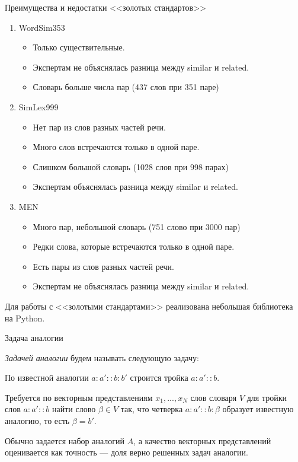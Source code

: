 \documentclass[9pt]{beamer}
\begin{document}
\begin{frame}{Преимущества и недостатки <<золотых стандартов>>}

\begin{enumerate}
    \item WordSim353
    \begin{itemize}
        \item Только существительные.
        \item Экспертам не объяснялась разница между similar и related.
        \item Словарь больше числа пар (437 слов при 351 паре)
    \end{itemize}
    \item SimLex999
    \begin{itemize}
        \item Нет пар из слов разных частей речи.
        \item Много слов встречаются только в одной паре.
        \item Слишком большой словарь (1028 слов при 998 парах)
        \item Экспертам объяснялась разница между similar и related.
    \end{itemize}
    \item MEN
     \begin{itemize}
        \item Много пар, небольшой словарь (751 слово при 3000 пар)
        \item Редки слова, которые встречаются только в одной паре.
        \item Есть пары из слов разных частей речи.
         \item Экспертам не объяснялась разница между similar и related.
     \end{itemize}
\end{enumerate}

Для работы с <<золотыми стандартами>> реализована небольшая библиотека на Python.
\end{frame}

\begin{frame}{Задача аналогии}

\textit{Задачей аналогии} будем называть следующую задачу:

По известной аналогии $a:a' :: b:b'$ строится тройка $a:a' :: b$.

Требуется по векторным представлениям $x_1, ..., x_N$ слов словаря $V$ для тройки слов $a:a' :: b$ найти слово $\beta \in V$ так, что четверка $a:a' :: b:\beta$ образует известную аналогию, то есть $\beta = b'$.
\vspace{\baselineskip}

Обычно задается набор аналогий $A$, а качество векторных представлений оценивается как точность  --- доля верно решенных задач аналогии.
    
\end{frame}
\end{document}
